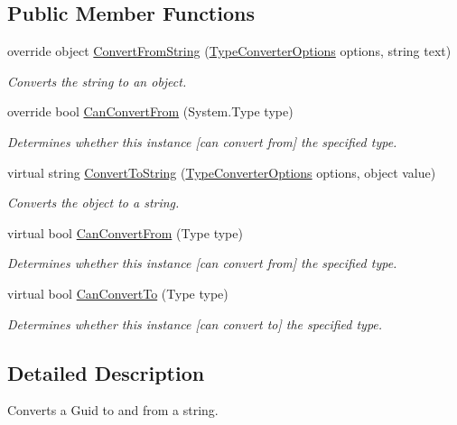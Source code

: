 \subsection*{Public Member Functions}
\begin{DoxyCompactItemize}
\item 
override object \hyperlink{a00104_ad00786c329498785bbb77407ea023877}{Convert\-From\-String} (\hyperlink{a00172}{Type\-Converter\-Options} options, string text)
\begin{DoxyCompactList}\small\item\em Converts the string to an object. \end{DoxyCompactList}\item 
override bool \hyperlink{a00104_a0a4f9bd355387b70241a9d5f92c7b0ef}{Can\-Convert\-From} (System.\-Type type)
\begin{DoxyCompactList}\small\item\em Determines whether this instance \mbox{[}can convert from\mbox{]} the specified type. \end{DoxyCompactList}\item 
virtual string \hyperlink{a00082_a36cb2f9b24f15a671293f3a722324c27}{Convert\-To\-String} (\hyperlink{a00172}{Type\-Converter\-Options} options, object value)
\begin{DoxyCompactList}\small\item\em Converts the object to a string. \end{DoxyCompactList}\item 
virtual bool \hyperlink{a00082_a470d21adaa704eb281250dbd112ff91a}{Can\-Convert\-From} (Type type)
\begin{DoxyCompactList}\small\item\em Determines whether this instance \mbox{[}can convert from\mbox{]} the specified type. \end{DoxyCompactList}\item 
virtual bool \hyperlink{a00082_acb65bd8c8199d88d5b1629ae35d18514}{Can\-Convert\-To} (Type type)
\begin{DoxyCompactList}\small\item\em Determines whether this instance \mbox{[}can convert to\mbox{]} the specified type. \end{DoxyCompactList}\end{DoxyCompactItemize}


\subsection{Detailed Description}
Converts a Guid to and from a string. 



